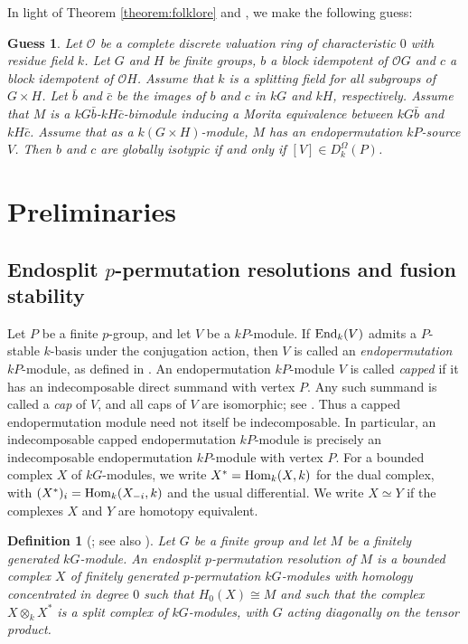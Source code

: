\documentclass[preprint,12pt,3p]{elsarticle}
\newtheorem{definition}[theorem]{Definition}%
\newtheorem{guess}[theorem]{Guess}%
\def\Hom{{\rm Hom}}
\def\O{\mathcal{O}}
\begin{document}
In light of Theorem \ref{theorem:folklore} and \cite[Theorem 1.1]{H26}, we make the following guess:

\begin{guess}\label{guess}
Let $\O$ be a complete discrete valuation ring of characteristic $0$ with residue field $k$. Let $G$ and $H$ be finite groups, $b$ a block idempotent of $\O G$ and $c$ a block idempotent of $\O H$. Assume that $k$ is a splitting field for all subgroups of $G\times H$. Let $\bar{b}$ and $\bar{c}$ be the images of $b$ and $c$ in $kG$ and $kH$, respectively. Assume that $M$ is a $kG\bar{b}$-$kH\bar{c}$-bimodule inducing a Morita equivalence between $kG\bar{b}$ and $kH\bar{c}$. Assume that as a $k(G\times H)$-module, $M$ has an endopermutation $kP$-source $V$. Then $b$ and $c$ are globally isotypic if and only if $[V]\in D_k^\Omega(P)$.
\end{guess}



\section{Preliminaries}\label{s2:Preliminaries}

\subsection{Endosplit $p$-permutation resolutions and fusion stability}

Let $P$ be a finite $p$-group, and let $V$ be a $kP$-module. If ${\rm End}_k(V)$ admits a $P$-stable $k$-basis under the conjugation action, then $V$ is called an {\it endopermutation} $kP$-module, as defined in \cite{Dade}. An endopermutation $kP$-module $V$ is called {\it capped} if it has an indecomposable direct summand with vertex $P$. Any such summand is called a {\it cap} of $V$, and all caps of $V$ are isomorphic; see \cite[\S3]{Th07}. Thus a capped endopermutation module need not itself be indecomposable. In particular, an indecomposable capped endopermutation $kP$-module is precisely an indecomposable endopermutation $kP$-module with vertex $P$. For a bounded complex $X$ of $kG$-modules, we write $X^*=\Hom_k(X,k)$ for the dual complex, with $(X^*)_i=\Hom_k(X_{-i},k)$ and the usual differential. We write $X\simeq Y$ if the complexes $X$ and $Y$ are homotopy equivalent.

\begin{definition}[{\cite[\S7]{Rickard}}; see also {\cite[Definition 7.11.1]{Lin18b}}]
{\rm Let $G$ be a finite group and let $M$ be a finitely generated $kG$-module. An {\it endosplit $p$-permutation resolution of $M$} is a bounded complex $X$ of finitely generated $p$-permutation $kG$-modules with homology concentrated in degree $0$ such that $H_0(X)\cong M$ and such that the complex $X\otimes_k X^*$ is a split complex of $kG$-modules, with $G$ acting diagonally on the tensor product.}
\end{definition}
\end{document}
